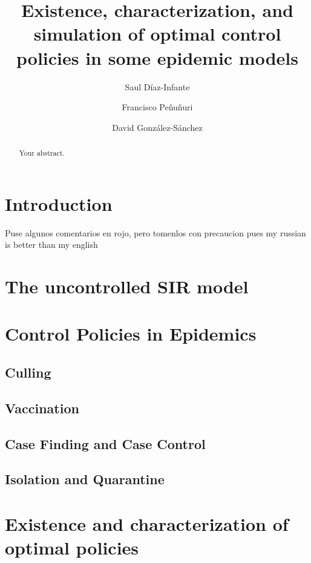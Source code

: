 \documentclass[titlepage]{amsart}
\title[%
	Existence, characterization and simulation of OCP for a family of epidemic 
	Models%
	]{
	Existence, characterization, and simulation
	of optimal control policies in some epidemic models
}
\author[S. D\'iaz-Infante]{Saul D\'iaz-Infante}
\author[F. Pe\~nu\~nuri]{Francisco Pe\~nu\~nuri}
\author[D. Gonz\'alez-S\'anchez]{David Gonz\'alez-S\'anchez}
\begin{document}
	\maketitle
  \begin{abstract}
  	Your abstract.
  \end{abstract}
%

  \section{Introduction}
 {\color{red} Puse algunos comentarios en rojo, pero tomenlos con precaucion pues my 
russian is better than my english\\}
    
  \section{The uncontrolled SIR model}
    
  \section{Control Policies in Epidemics}
    
    \subsection{Culling}
      
    \subsection{Vaccination}
      
    \subsection{Case Finding and Case Control}
      
    \subsection{Isolation and Quarantine}
      

  \section{Existence and characterization of optimal policies}
    
%
%
\end{document}
